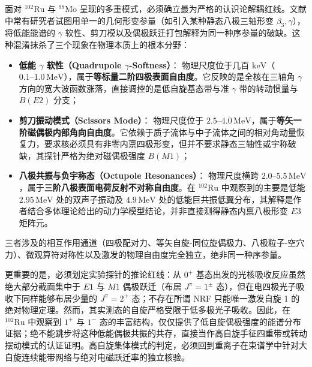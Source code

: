 面对 $^{102}\mathrm{Ru}$ 与 $^{98}\mathrm{Mo}$ 呈现的多重模式，必须确立最为严格的认识论解耦红线。文献中常有研究者试图用单一的几何形变参量（如引入某种静态八极三轴形变 $\beta_3, \gamma$），将低能能谱的 $\gamma$ 软性、剪刀模以及偶极跃迁打包解释为同一种序参量的破缺。这种混淆抹杀了三个现象在物理本质上的根本分野：
\begin{itemize}
\item \textbf{低能 $\gamma$ 软性（Quadrupole $\gamma$-Softness）}：
  物理尺度位于几百 $\mathrm{keV}$（$0.1\text{--}1.0\,\mathrm{MeV}$），属于\textbf{等标量二阶四极表面自由度}。它反映的是全核在三轴角 $\gamma$ 方向的宽大波函数涨落，直接调控的是低自旋基态带与准 $\gamma$ 带的转动惯量与 $B(E2)$ 分支；
\item \textbf{剪刀振动模式（Scissors Mode）}：
  物理尺度位于 $2.5\text{--}4.0\,\mathrm{MeV}$，属于\textbf{等矢一阶磁偶极内部角向自由度}。它依赖于质子流体与中子流体之间的相对角动量恢复力，要求核必须具有非零内禀四极形变，但并不要求静态三轴性或宇称破缺，其探针严格为绝对磁偶极强度 $B(M1)$；
\item \textbf{八极共振与负宇称态（Octupole Resonances）}：
  物理尺度横跨 $2.0\text{--}5.5\,\mathrm{MeV}$，属于\textbf{三阶八极表面电荷反射不对称自由度}。在 $^{102}\mathrm{Ru}$ 中观察到的主要是低能 $2.95\,\mathrm{MeV}$ 处的双声子振动及 $4.9\,\mathrm{MeV}$ 处的低能巨共振低翼分布，其解释是作者结合多体理论给出的动力学模型结论，并非直接测得静态内禀八极形变 $E3$ 矩阵元。
\end{itemize}

三者涉及的相互作用通道（四极配对力、等矢自旋-同位旋偶极力、八极粒子-空穴力）、微观算符对称性以及激发的物理自由度完全独立，绝非同一种序参量。

更重要的是，必须划定实验探针的推论红线：从 $0^+$ 基态出发的光核吸收反应虽然绝大部分截面集中于 $E1$ 与 $M1$ 偶极跃迁（布居 $J^\pi = 1^\pm$ 态），但在电四极光子吸收下同样能够布居少量的 $J^\pi = 2^+$ 态；不存在所谓 NRF 只能唯一激发自旋 1 的绝对物理定理。然而，其实测态的自旋严格受限于低多极光子吸收。因此，在 $^{102}\mathrm{Ru}$ 中观察到 $1^+$ 与 $1^-$ 态的丰富结构，仅仅提供了低自旋偶极强度的能谱分布证据；绝不能跳步将这种低能偶极共振的共存，直接当作高自旋手征四重带或转动摆动模式的认证证明。高自旋集体模式的判定，必须回到重离子在束谱学中针对大自旋连续能带网络与绝对电磁跃迁率的独立核验。
